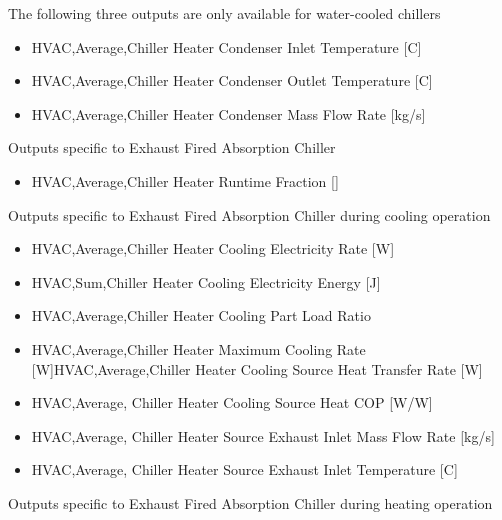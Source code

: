 The following three outputs are only available for water-cooled chillers

\begin{itemize}
    \item
    HVAC,Average,Chiller Heater Condenser Inlet Temperature {[}C{]}
    \item
    HVAC,Average,Chiller Heater Condenser Outlet Temperature {[}C{]}
    \item
    HVAC,Average,Chiller Heater Condenser Mass Flow Rate {[}kg/s{]}
\end{itemize}

Outputs specific to Exhaust Fired Absorption Chiller

\begin{itemize}
    \tightlist
    \item
    HVAC,Average,Chiller Heater Runtime Fraction {[]}
\end{itemize}

Outputs specific to Exhaust Fired Absorption Chiller during cooling operation

\begin{itemize}
    \item
    HVAC,Average,Chiller Heater Cooling Electricity Rate {[}W{]}
    \item
    HVAC,Sum,Chiller Heater Cooling Electricity Energy {[}J{]}
    \item
    HVAC,Average,Chiller Heater Cooling Part Load Ratio
    \item
    HVAC,Average,Chiller Heater Maximum Cooling Rate {[}W{]}HVAC,Average,Chiller Heater Cooling Source Heat Transfer Rate {[}W{]}
    \item
    HVAC,Average, Chiller Heater Cooling Source Heat COP {[}W/W{]}
    \item
    HVAC,Average, Chiller Heater Source Exhaust Inlet Mass Flow Rate {[}kg/s{]}
    \item
    HVAC,Average, Chiller Heater Source Exhaust Inlet Temperature {[}C{]}
\end{itemize}

Outputs specific to Exhaust Fired Absorption Chiller during heating operation

